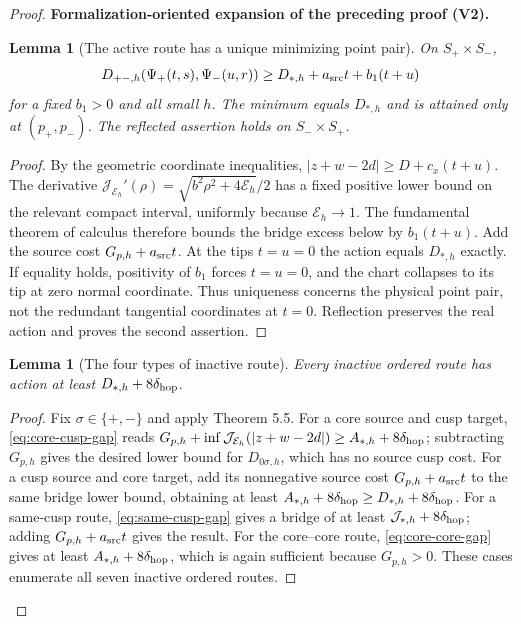 \documentclass[11pt]{article}
\newtheorem{lemma}[theorem]{Lemma}
\newcommand{\formalisationparentid}{X}
\newenvironment{formalisationaddition}[1]{\par\medskip\begingroup\color{blue}\def\formalisationparentid{#1}\setcounter{formalizationsublemma}{0}\let\lemma\formalizationsublemma\let\endlemma\endformalizationsublemma
  \def\Eo{\mathcal E_h^\circ}\def\EE{\mathcal E_h}\def\phio{\phi_h^\circ}\def\phih{\phi_h}\def\Ho{H_h^{\rm atom}(v^\circ)}\def\Ha{H_h^{\rm atom}}\def\HL{H_h^{L}}\def\Dh{D_h}\def\Log{\operatorname{Log}}\def\ellh{\ell_h}\def\Gp{G_{p,h}}\def\Ast{A_{*,h}}\def\ahat{\widehat{\mathfrak a}_h}\def\ah{\mathfrak a_h}\def\rh{\widehat\rho_h}\def\deltah{\widehat\delta_h}\def\oldref##1{\textup{(##1)}}\def\interface##1{\par\noindent\textit{Analytical interface used here.} ##1\par}\def\finish{\par\noindent\textit{Conclusion of the formalization-oriented expansion.} }\par\noindent\textbf{Formalization-oriented expansion of the preceding proof (V2).}\par\smallskip
}{\par\endgroup\medskip
}
\newcommand{\cJ}{\mathcal J}
\begin{document}
\begin{proof}
\begin{formalisationaddition}{L8.1}
\begin{lemma}[The active route has a unique minimizing point pair]\label{sublemma:L8-1-active}
On $S_+\times S_-$,
\[
 D_{+-,h}(\Psi_+(t,s),\Psi_-(u,r))
 \ge D_{*,h}+a_{\rm src}t+b_1(t+u)
\]
for a fixed $b_1>0$ and all small $h$. The minimum equals $D_{*,h}$ and is attained only at $(p_+,p_-)$. The reflected assertion holds on $S_-\times S_+$.
\end{lemma}
\begin{proof}
By the geometric coordinate inequalities, $|z+w-2d|\ge D+c_x(t+u)$. The derivative $\cJ_{\EE}'(\rho)=\sqrt{b^2\rho^2+4\EE}/2$ has a fixed positive lower bound on the relevant compact interval, uniformly because $\EE\to1$. The fundamental theorem of calculus therefore bounds the bridge excess below by $b_1(t+u)$. Add the source cost $\Gp+a_{\rm src}t$. At the tips $t=u=0$ the action equals $D_{*,h}$ exactly. If equality holds, positivity of $b_1$ forces $t=u=0$, and the chart collapses to its tip at zero normal coordinate. Thus uniqueness concerns the physical point pair, not the redundant tangential coordinates at $t=0$. Reflection preserves the real action and proves the second assertion.
\end{proof}

\begin{lemma}[The four types of inactive route]\label{sublemma:L8-1-inactive}
Every inactive ordered route has action at least $D_{*,h}+8\delta_{\rm hop}$.
\end{lemma}
\begin{proof}
Fix $\sigma\in\{+,-\}$ and apply Theorem 5.5. For a core source and cusp target, \eqref{eq:core-cusp-gap} reads $\Gp+\inf \cJ_{\EE}(|z+w-2d|)\ge\Ast+8\delta_{\rm hop}$; subtracting $\Gp$ gives the desired lower bound for $D_{0\sigma,h}$, which has no source cusp cost. For a cusp source and core target, add its nonnegative source cost $\Gp+a_{\rm src}t$ to the same bridge lower bound, obtaining at least $\Ast+8\delta_{\rm hop}\ge D_{*,h}+8\delta_{\rm hop}$. For a same-cusp route, \eqref{eq:same-cusp-gap} gives a bridge of at least $\cJ_{*,h}+8\delta_{\rm hop}$; adding $\Gp+a_{\rm src}t$ gives the result. For the core--core route, \eqref{eq:core-core-gap} gives at least $\Ast+8\delta_{\rm hop}$, which is again sufficient because $\Gp>0$. These cases enumerate all seven inactive ordered routes.
\end{proof}


\end{formalisationaddition}
\end{proof}
\end{document}
